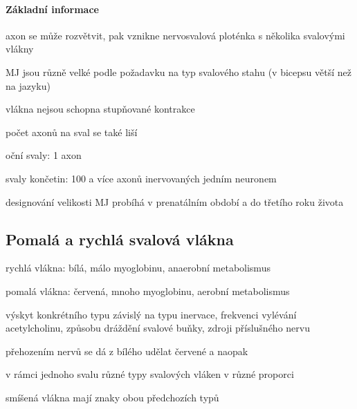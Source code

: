 \documentclass[DIV=8]{scrreprt}
\begin{document}
\paragraph{Základní informace}
\begin{myItemize}[nosep]
    \item axon se může rozvětvit, pak vznikne nervosvalová ploténka s několika svalovými vlákny
    \item MJ jsou různě velké podle požadavku na typ svalového stahu (v bicepsu větší než na jazyku)
    \item vlákna nejsou schopna stupňované kontrakce
    \item počet axonů na sval se také liší
\begin{myItemize}[nosep]
    \item oční svaly: 1 axon
    \item svaly končetin: 100 a více axonů inervovaných jedním neuronem
\end{myItemize}

    \item designování velikosti MJ probíhá v prenatálním období a do třetího roku života
\end{myItemize}



\subsection{Pomalá a rychlá svalová vlákna} \label{Pomalá a rychlá svalová vlákna}


\begin{myItemize}[nosep]
    \item rychlá vlákna: bílá, málo myoglobinu, anaerobní metabolismus
    \item pomalá vlákna: červená, mnoho myoglobinu, aerobní metabolismus
    \item výskyt konkrétního typu závislý na typu inervace, frekvenci vylévání acetylcholinu, způsobu dráždění svalové buňky, zdroji příslušného nervu
\begin{myItemize}[nosep]
    \item přehozením nervů se dá z bílého udělat červené a naopak
\end{myItemize}

    \item v rámci jednoho svalu různé typy svalových vláken v různé proporci
    \item smíšená vlákna mají znaky obou předchozích typů
\end{myItemize}
\end{document}
